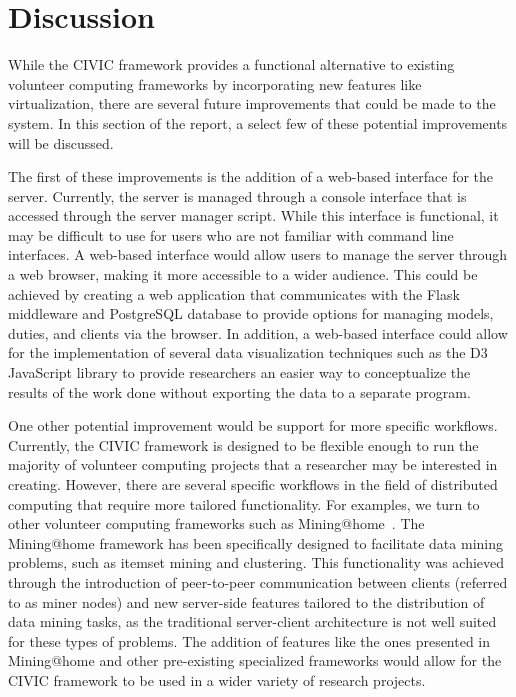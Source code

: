 \documentclass[11pt]{article}
\begin{document}
\section{Discussion}

While the CIVIC framework provides a functional alternative to existing volunteer computing frameworks by incorporating new features like virtualization, there are several future improvements that could be made to the system. In this section of the report, a select few of these potential improvements will be discussed. 

The first of these improvements is the addition of a web-based interface for the server. Currently, the server is managed through a console interface that is accessed through the server manager script. While this interface is functional, it may be difficult to use for users who are not familiar with command line interfaces. A web-based interface would allow users to manage the server through a web browser, making it more accessible to a wider audience. This could be achieved by creating a web application that communicates with the Flask middleware and PostgreSQL database to provide options for managing models, duties, and clients via the browser. In addition, a web-based interface could allow for the implementation of several data visualization techniques such as the D3 JavaScript library to provide researchers an easier way to conceptualize the results of the work done without exporting the data to a separate program.

One other potential improvement would be support for more specific workflows. Currently, the CIVIC framework is designed to be flexible enough to run the majority of volunteer computing projects that a researcher may be interested in creating. However, there are several specific workflows in the field of distributed computing that require more tailored functionality. For examples, we turn to other volunteer computing frameworks such as Mining@home~\cite{Lucchese2010}. The Mining@home framework has been specifically designed to facilitate data mining problems, such as itemset mining and clustering. This functionality was achieved through the introduction of peer-to-peer communication between clients (referred to as miner nodes) and new server-side features tailored to the distribution of data mining tasks, as the traditional server-client architecture is not well suited for these types of problems. The addition of features like the ones presented in Mining@home and other pre-existing specialized frameworks would allow for the CIVIC framework to be used in a wider variety of research projects.
\end{document}
